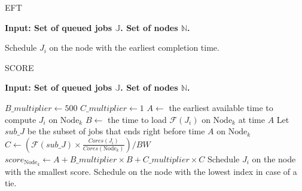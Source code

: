 \documentclass[a4paper]{article}
\newcommand{\Node}[1]{\ensuremath{\mathrm{Node}_{#1}}\xspace}
\newcommand{\inputs}{\ensuremath{\mathcal{F}}\xspace}
\newcommand{\memory}{\ensuremath{\mathcal{M}}\xspace}
\newcommand{\bandwidth}{\mathit{BW}\xspace}
\newcommand{\core}{\mathit{Cores}\xspace}
\newcommand{\jobset}{\ensuremath{\mathbb{J}}\xspace}
\newcommand{\nodeset}{\ensuremath{\mathbb{N}}\xspace}
\begin{document}
\begin{algorithm}[htbp]
\caption{EFT}
\hspace*{\algorithmicindent} \textbf{Input: Set of queued jobs $\jobset$. Set of nodes $\nodeset$.} \\
\begin{algorithmic}[1]
\ForEach {$J_i \in \jobset$}
	\State Schedule $J_i$ on the node with the earliest completion time. 
\EndFor
\end{algorithmic}
\end{algorithm}

\begin{algorithm}[htbp]
\caption{SCORE}
\hspace*{\algorithmicindent} \textbf{Input: Set of queued jobs $\jobset$. Set of nodes $\nodeset$.} \\
\begin{algorithmic}[1]
\State $B\_multiplier \gets 500$
\State $C\_multiplier \gets 1$
\ForEach {$J_i \in \jobset$}
	\ForEach {$\Node{k} \in \nodeset$}
		\State $A \gets$ the earliest available time to compute $J_i$ on $\Node{k}$
		\State $B \gets$ the time to load $\inputs(J_i)$ on $\Node{k}$ at time $A$ 
		\State Let $\mathit{sub\_J}$ be the subset of jobs that ends right before time $A$ on $\Node{k}$
		\State $C \gets (\inputs(\mathit{sub\_J}) \times \frac{\core(J_i)}{\core(\Node{k})})/\bandwidth$
		\State $score_{\Node{k}} \gets A + B\_multiplier \times B + C\_multiplier \times C$
	\EndFor
	\State Schedule $J_i$ on the node with the smallest score. Schedule on the node with the lowest index in case of a tie.
\EndFor
\end{algorithmic}
\end{algorithm}
\end{document}
